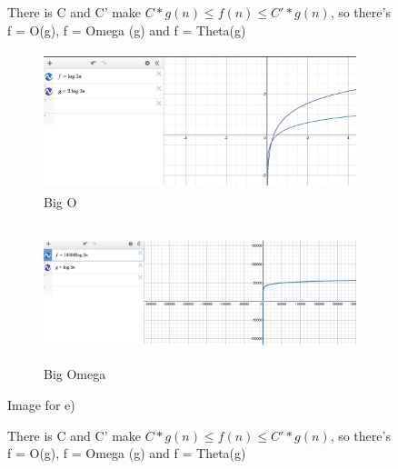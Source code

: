 \documentclass{article}
\begin{document}
\begin{enumerate}[label=(\alph*)]
\begin{figure}[h]
\item %
There is C and C' make $C*g(n) \le f(n) \le C'*g(n)$, so  there's f = O(g), f = Omega (g) and f = Theta(g)\\
    \begin{subfigure}{0.5\textwidth}
    \includegraphics[width=0.9\linewidth, height=4cm]{e) big O.png}
    \caption{Big O}
    \label{fig:subim1}
    \end{subfigure}
    \begin{subfigure}{0.5\textwidth}
    \includegraphics[width=0.9\linewidth, height=4cm]{ e) big omega.png}
    \caption{Big Omega}
    \label{fig:subim2}
    \end{subfigure}
    \caption{Image for e)}
    \label{fig:image2}
\end{figure}

\begin{figure}[h]
\item %
There is C and C' make $C*g(n) \le f(n) \le C'*g(n)$, so  there's f = O(g), f = Omega (g) and f = Theta(g)\\
    

\end{figure}
\end{enumerate}
\end{document}
